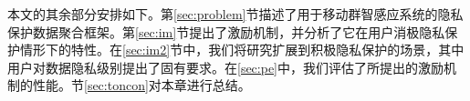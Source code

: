 	
	本文的其余部分安排如下。第\ref{sec:problem}节描述了用于移动群智感应系统的隐私保护数据聚合框架。第\ref{sec:im}节提出了激励机制，并分析了它在用户消极隐私保护情形下的特性。在\ref{sec:im2}节中，我们将研究扩展到积极隐私保护的场景，其中用户对数据隐私级别提出了固有要求。在\ref{sec:pe}中，我们评估了所提出的激励机制的性能。节\ref{sec:toncon}对本章进行总结。

